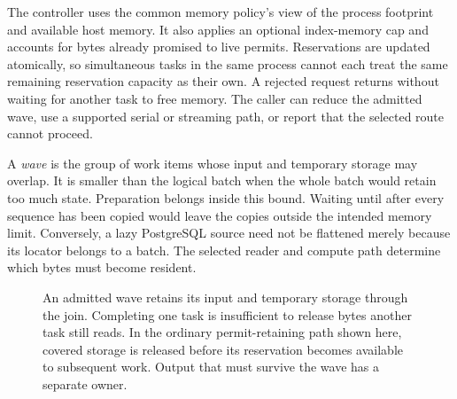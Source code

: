 The controller uses the common memory policy's view of the process
footprint and available host memory. It also applies an optional index-memory
cap and accounts for bytes already promised to live permits. Reservations
are updated atomically, so simultaneous tasks in the same process cannot
each treat the same remaining reservation capacity as their own. A rejected
request returns without waiting for another task to free memory. The caller
can reduce the admitted wave, use a supported serial or streaming path, or
report that the selected route cannot proceed.

A \emph{wave} is the group of work items whose input and temporary storage
may overlap. It is smaller than the logical batch when the whole batch
would retain too much state. Preparation belongs inside this bound. Waiting
until after every sequence has been copied would leave the copies outside
the intended memory limit. Conversely, a lazy PostgreSQL source need not be
flattened merely because its locator belongs to a batch. The selected
reader and compute path determine which bytes must become resident.

\begin{figure}[htbp]
\centering
{}
\caption{An admitted wave retains its input and temporary storage through the
join. Completing one task is insufficient to release bytes another task
still reads. In the ordinary permit-retaining path shown here, covered
storage is released before its reservation becomes available to subsequent
work. Output that must survive the wave has a separate owner.}
\label{fig:arch-wave-lifetime}
\end{figure}

